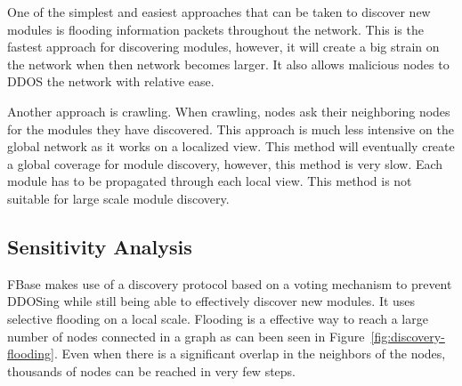 One of the simplest and easiest approaches that can be taken to discover new modules is flooding information packets throughout the network. This is the fastest approach for discovering modules, however, it will create a big strain on the network when then network becomes larger. It also allows malicious nodes to DDOS the network with relative ease.

Another approach is crawling. When crawling, nodes ask their neighboring nodes for the modules they have discovered. This approach is much less intensive on the global network as it works on a localized view. This method will eventually create a global coverage for module discovery, however, this method is very slow. Each module has to be propagated through each local view. This method is not suitable for large scale module discovery.

\subsection{Sensitivity Analysis}

FBase makes use of a discovery protocol based on a voting mechanism to prevent DDOSing while still being able to effectively discover new modules. It uses selective flooding on a local scale. Flooding is a effective way to reach a large number of nodes connected in a graph as can been seen in Figure~\ref{fig:discovery-flooding}. Even when there is a significant overlap in the neighbors of the nodes, thousands of nodes can be reached in very few steps.

